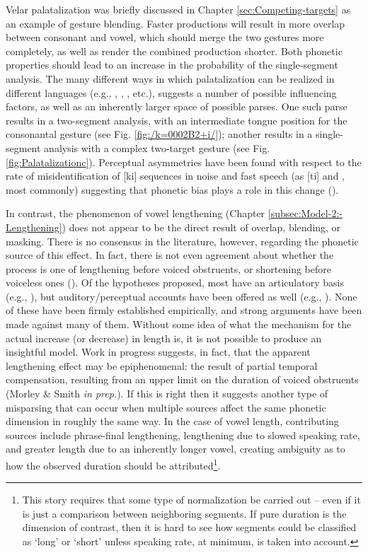 Velar palatalization was briefly discussed in Chapter \ref{sec:Competing-targets}
as an example of gesture blending. Faster productions will result
in more overlap between consonant and vowel, which should merge the
two gestures more completely, as well as render the combined production
shorter. Both phonetic properties should lead to an increase in the
probability of the single-segment analysis. The many different ways
in which palatalization can be realized in different languages (e.g.,
, , ,
etc.), suggests a number of possible influencing factors, as well
as an inherently larger space of possible parses. One such parse results
in a two-segment analysis, with an intermediate tongue position for
the consonantal gesture (see Fig. \ref{fig:/k=0002B2+i/}); another
results in a single-segment analysis with a complex two-target gesture
(see Fig. \ref{fig:Palatalizationc}). Perceptual asymmetries have
been found with respect to the rate of misidentification of {[}ki{]}
sequences in noise and fast speech (as {[}ti{]} and \textipa{[t͡Si]},
most commonly) suggesting that phonetic bias plays a role in this
change (\citealt{Guion1998,Chang2001}).

In contrast, the phenomenon of vowel lengthening (Chapter \ref{subsec:Model-2:-Lengthening})
does not appear to be the direct result of overlap, blending, or masking.
There is no consensus in the literature, however, regarding the phonetic
source of this effect. In fact, there is not even agreement about
whether the process is one of lengthening before voiced obstruents,
or shortening before voiceless ones (\citealt{gimson1970introduction,wells1982accents}).
Of the hypotheses proposed, most have an articulatory basis (e.g.,
\citealt{belasco1958variations,delattre1962some,chen1970vowel,lisker1974explaining,Klatt1976,moreton2004realization,schwartz2010phonology}),
but auditory/perceptual accounts have been offered as well (e.g.,
\citealt{lisker1957closure,javkin1977phonetic,Kluender1988}). None
of these have been firmly established empirically, and strong arguments
have been made against many of them. Without some idea of what the
mechanism for the actual increase (or decrease) in length is, it is
not possible to produce an insightful model. Work in progress suggests,
in fact, that the apparent lengthening effect may be epiphenomenal:
the result of partial temporal compensation, resulting from an upper
limit on the duration of voiced obstruents (Morley \& Smith \emph{in
prep.}). If this is right then it suggests another type of misparsing
that can occur when multiple sources affect the same phonetic dimension
in roughly the same way. In the case of vowel length, contributing
sources include phrase-final lengthening, lengthening due to slowed
speaking rate, and greater length due to an inherently longer vowel,
creating ambiguity as to how the observed duration should be attributed\footnote{This story requires that some type of normalization be carried out
– even if it is just a comparison between neighboring segments. If
pure duration is the dimension of contrast, then it is hard to see
how segments could be classified as `long' or `short' unless speaking
rate, at minimum, is taken into account.}.


